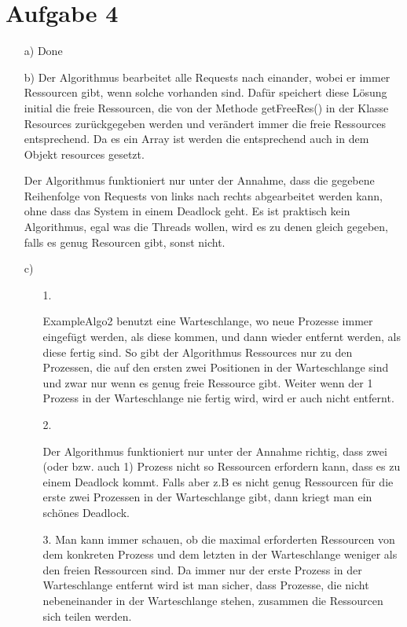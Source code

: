 \section{Aufgabe 4}

\begin{enumerate}

\item[a)] Done

\item[b)] 
Der Algorithmus bearbeitet alle Requests nach einander, wobei er immer Ressourcen gibt, wenn solche vorhanden sind. Dafür speichert diese Lösung initial die freie Ressourcen, die von der Methode getFreeRes() in der Klasse Resources zurückgegeben werden und verändert immer die freie Ressources entsprechend. Da es ein Array ist werden die entsprechend auch in dem Objekt resources gesetzt.

Der Algorithmus funktioniert nur unter der Annahme, dass die gegebene Reihenfolge von Requests von links nach rechts abgearbeitet werden kann, ohne dass das System in einem Deadlock geht. Es ist praktisch kein Algorithmus, egal was die Threads wollen, wird es zu denen gleich gegeben, falls es genug Resourcen gibt, sonst nicht.

\item[c)]
\begin{enumerate}

\item[1.]

ExampleAlgo2 benutzt eine Warteschlange, wo neue Prozesse immer eingefügt werden, als diese kommen, und dann wieder entfernt werden, als diese fertig sind. So gibt der Algorithmus Ressources nur zu den Prozessen, die auf den ersten zwei Positionen in der Warteschlange sind und zwar nur wenn es genug freie Ressource gibt. Weiter wenn der 1 Prozess in der Warteschlange nie fertig wird, wird er auch nicht entfernt.

\item[2.]

Der Algorithmus funktioniert nur unter der Annahme richtig, dass zwei (oder bzw. auch 1) Prozess nicht so Ressourcen erfordern kann, dass es zu einem Deadlock kommt. Falls aber z.B es nicht genug Ressourcen für die erste zwei Prozessen in der Warteschlange gibt, dann kriegt man ein schönes Deadlock.

\item[3.]
Man kann immer schauen, ob die maximal erforderten Ressourcen von dem konkreten Prozess und dem letzten in der Warteschlange weniger als den freien Ressourcen sind. Da immer nur der erste Prozess in der Warteschlange entfernt wird ist man sicher, dass Prozesse, die nicht nebeneinander in der Warteschlange stehen, zusammen die Ressourcen sich teilen werden.


\end{enumerate}
\end{enumerate}
